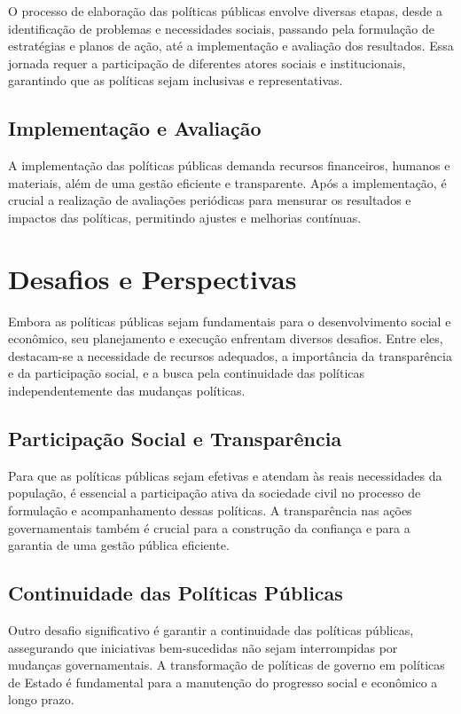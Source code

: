 \documentclass[
   article,       
   12pt,          
   oneside,       
   a4paper,       
   english,       
   brazil,        
   sumario=tradicional
   ]{abntex2}
\begin{document}
O processo de elaboração das políticas públicas envolve diversas etapas, desde a identificação de problemas e necessidades sociais, passando pela formulação de estratégias e planos de ação, até a implementação e avaliação dos resultados. Essa jornada requer a participação de diferentes atores sociais e institucionais, garantindo que as políticas sejam inclusivas e representativas.

\subsection{Implementação e Avaliação}

A implementação das políticas públicas demanda recursos financeiros, humanos e materiais, além de uma gestão eficiente e transparente. Após a implementação, é crucial a realização de avaliações periódicas para mensurar os resultados e impactos das políticas, permitindo ajustes e melhorias contínuas.

\section{Desafios e Perspectivas}

Embora as políticas públicas sejam fundamentais para o desenvolvimento social e econômico, seu planejamento e execução enfrentam diversos desafios. Entre eles, destacam-se a necessidade de recursos adequados, a importância da transparência e da participação social, e a busca pela continuidade das políticas independentemente das mudanças políticas.

\subsection{Participação Social e Transparência}

Para que as políticas públicas sejam efetivas e atendam às reais necessidades da população, é essencial a participação ativa da sociedade civil no processo de formulação e acompanhamento dessas políticas. A transparência nas ações governamentais também é crucial para a construção da confiança e para a garantia de uma gestão pública eficiente.

\subsection{Continuidade das Políticas Públicas}

Outro desafio significativo é garantir a continuidade das políticas públicas, assegurando que iniciativas bem-sucedidas não sejam interrompidas por mudanças governamentais. A transformação de políticas de governo em políticas de Estado é fundamental para a manutenção do progresso social e econômico a longo prazo.
\end{document}
